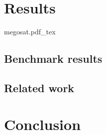 \chapter{Results}
\label{ch:results}
%
\vspace{50pt}
\begin{center}
  \def\svgwidth{100pt}
  {megosat.pdf_tex}
\end{center}

\section{Benchmark results}

\section{Related work}

\chapter{Conclusion}
\label{ch:conclusion}






